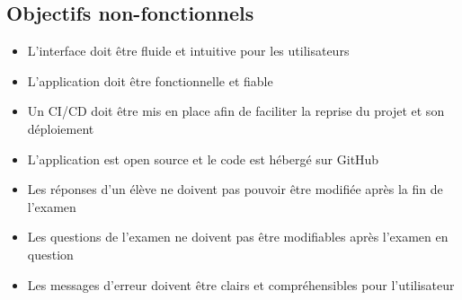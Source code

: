 \subsection*{Objectifs non-fonctionnels}

\begin{itemize}
    \item L'interface doit être fluide et intuitive pour les utilisateurs
    \item L'application doit être fonctionnelle et fiable
    \item Un CI/CD doit être mis en place afin de faciliter la reprise du projet et son déploiement
    \item L'application est open source et le code est hébergé sur GitHub
    \item Les réponses d'un élève ne doivent pas pouvoir être modifiée après la fin de l'examen
    \item Les questions de l'examen ne doivent pas être modifiables après l'examen en question
    \item Les messages d'erreur doivent être clairs et compréhensibles pour l'utilisateur
\end{itemize}
